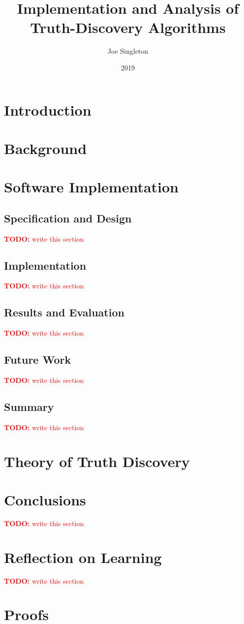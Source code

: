 \documentclass[12pt]{report}
\date{2019}
\author{Joe Singleton}
\title{Implementation and Analysis of Truth-Discovery Algorithms}
\theoremstyle{definition} \newtheorem{definition}{Definition}
\theoremstyle{definition} \newtheorem{example}{Example}
\theoremstyle{plain} \newtheorem{axiom}{Axiom}
\theoremstyle{plain} \newtheorem*{remark}{Remark}
\theoremstyle{remark} \newtheorem*{notation}{Notation}
\theoremstyle{plain} \newtheorem{lemma}{Lemma}
\theoremstyle{plain} \newtheorem{theorem}{Theorem}
\theoremstyle{plain} \newtheorem{proposition}{Proposition}
\newcommand{\todo}[1] {
    \textcolor{red}{
        \textbf{TODO:} #1
    }
}
\begin{document}
\maketitle



\tableofcontents

\chapter{Introduction}


\chapter{Background}


\chapter{Software Implementation}
\section{Specification and Design}
\todo{write this section}
\section{Implementation}
\todo{write this section}
\section{Results and Evaluation}
\todo{write this section}
\section{Future Work}
\todo{write this section}
\section{Summary}
\todo{write this section}

\chapter{Theory of Truth Discovery}


\chapter{Conclusions}
\todo{write this section}
\chapter{Reflection on Learning}
\todo{write this section}

\printbibliography[heading=bibintoc]

\appendix
\chapter{Proofs}

\end{document}
